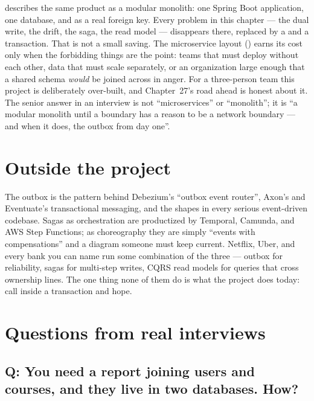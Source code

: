 \begin{decision}
 describes the same product as a modular monolith:
one Spring Boot application, one  database, and
 as a real foreign key. Every problem in this
chapter --- the dual write, the drift, the saga, the read model ---
disappears there, replaced by a  and a transaction. That is
not a small saving. The microservice layout () earns its
cost only when the forbidding things are the point: teams that must
deploy without each other, data that must scale separately, or an
organization large enough that a shared schema \emph{would} be joined
across in anger. For a three-person team this project is deliberately
over-built, and Chapter~27's road ahead is honest about it. The senior
answer in an interview is not ``microservices'' or ``monolith''; it is
``a modular monolith until a boundary has a reason to be a network
boundary --- and when it does, the outbox from day one''.
\end{decision}

\section{Outside the project}

The outbox is the pattern behind Debezium's ``outbox event router'',
Axon's and Eventuate's transactional messaging, and the
 shapes in every serious event-driven
codebase. Sagas as orchestration are productized by Temporal, Camunda,
and AWS Step Functions; as choreography they are simply ``events with
compensations'' and a diagram someone must keep current. Netflix, Uber,
and every bank you can name run some combination of the three ---
outbox for reliability, sagas for multi-step writes, CQRS read models
for queries that cross ownership lines. The one thing none of them do is
what the project does today: call  inside a transaction
and hope.

\section{Questions from real interviews}

\subsection*{Q: You need a report joining users and courses, and they live in two databases. How?}

